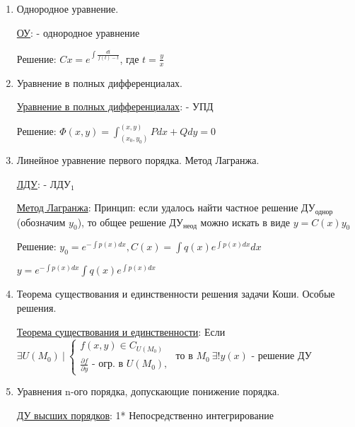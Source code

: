 \documentclass[12pt]{article}
\begin{document}
\begin{enumerate}
        \item Однородное уравнение.

        \hyperlink{homogeneousequation}{ОУ}:  - однородное уравнение

        Решение: $Cx = e^{\int\frac{dt}{f(t) - t}}$, где $t = \frac{y}{x}$

        \item Уравнение в полных дифференциалах.

        \hyperlink{equationincompletedifferentials}{Уравнение в полных дифференциалах}:  - УПД

        Решение: $\Phi(x, y) = \int^{(x,y)}_{(x_0,y_0)} Pdx + Qdy = 0$

        \item Линейное уравнение первого порядка. Метод Лагранжа.

        \hyperlink{lineardifferentialequation}{ЛДУ}:  - ЛДУ$_1$

        \hyperlink{methodLagrange}{Метод Лагранжа}: Принцип: если удалось найти частное решение ДУ$_\text{однор}$ (обозначим $y_0$), то общее решение ДУ$_\text{неод}$
        можно искать в виде $y = C(x)y_0$

        Решение: $y_0 = e^{-\int p(x) dx}, C(x) = \int q(x) e^{\int p(x)dx} dx$

        $y = e^{-\int p(x) dx} \int q(x) e^{\int p(x)dx} $

        \item Теорема существования и единственности решения задачи Коши. Особые решения.

        \hyperlink{existenceanduniquenessofsolution}{Теорема существования и единственности}: \Ths Если $\exists U(M_0) \ | \
        \begin{cases}
            f(x,y) \in C_{U(M_0)} \\
            \frac{\partial f}{\partial y}\text{ - огр. в } U(M_0),
        \end{cases}$ то в $M_0\ \exists! y(x)$ - решение ДУ


        \item Уравнения n-ого порядка, допускающие понижение порядка.

        \hyperlink{differentilaequationshigherdegree}{ДУ высших порядков}:     1* Непосредственно интегрирование


\end{enumerate}
\end{document}
